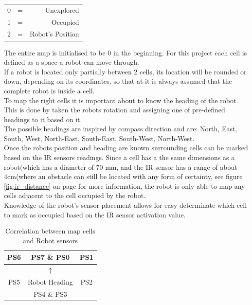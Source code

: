 \begin{table}[h]
\begin{center}
\begin{tabular}{l c r}
0 & = & Unexplored \\
1 & = & Occupied \\
2 & = & Robot's Position \\
\end{tabular}
\end{center}
\end{table}

The entire map is initialised to be 0 in the beginning. For this project each cell is defined as a space a robot can move through. \\
If a robot is located only partially between 2 cells, its location will be rounded or down, depending on its coordinates, so that at it is always assumed that the complete robot is inside a cell.\\

To map the right cells it is important about to know the heading of the robot. This is done by taken the robots rotation and assigning one of pre-defined headings to it based on it. \\
The possible headings are inspired by compass direction and are: North, East, South, West, North-East, South-East, South-West, North-West.\\
Once the robots position and heading are known surrounding cells can be marked based on the IR sensors readings. Since a cell has a the same dimensions as a robot(which has a diameter of 70 mm, and the IR sensor has a range of about 4cm(where an obstacle can still be located with any form of certainty, see figure \ref{fig:ir_distance} on page \pageref{fig:ir_distance} for more information, the robot is only able to map any cells adjacent to the cell occupied by the robot. \\
Knowledge of the robot's sensor placement allows for easy determinate which cell to mark as occupied based on the IR sensor activation value. \\

\begin{table}[h]
\begin{center}
\begin{tabular}{c | c | c}
PS6 & PS7 \& PS0 & PS1 \\\hline
 & $\uparrow$ & \\
PS5 & Robot Heading & PS2 \\\hline
 & PS4 \& PS3 & 
\end{tabular}
\caption{Correlation between map cells and Robot sensors}
\label{tab:cells}
\end{center}
\end{table}

